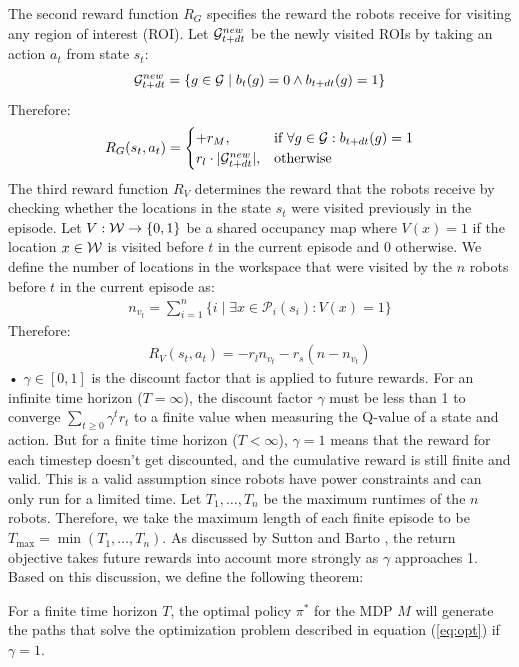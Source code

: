 \documentclass{article}
\begin{document}
The second reward function $R_G$ specifies the reward the robots receive for visiting any region of interest (ROI). Let $\mathcal{G}^{new}_{t+dt}$ be the newly visited ROIs by taking an action $a_t$ from state $s_t$:
\begin{equation}
    \mathcal{G}^{new}_{t+dt} = \{ g \in \mathcal{G} \mid b_t(g) = 0 \land b_{t+dt}(g) = 1 \}
\end{equation}
Therefore:
\begin{align}
R_G(s_t, a_t) = 
\begin{cases}
    +r_M, &\text{if } \forall g \in \mathcal{G}: b_{t+dt} (g) = 1 \\
    r_l \cdot |\mathcal{G}^{new}_{t+dt}|, & \text{otherwise} 
\end{cases}
\end{align}
The third reward function $R_V$ determines the reward that the robots receive by checking whether the locations in the state $s_t$ were visited previously in the episode. Let $V: {\mathcal{W}} \to \{0,1\}$ be a shared occupancy map where $V(x) = 1$ if the location $x \in \mathcal{W}$ is visited before $t$ in the current episode and 0 otherwise. We define the number of locations in the workspace that were visited by the $n$ robots before $t$ in the current episode as:
\begin{align}
n_{v_t} = \sum_{i=1}^n \{ i \mid \exists x \in \mathcal{P}_i(s_i): V(x) = 1 \}
\end{align}
Therefore:
\begin{align}
R_V(s_t, a_t) = - r_l n_{v_t} - r_s (n - n_{v_t}) \label{eq:reward_V}
\end{align}
• $\gamma \in [0,1]$ is the discount factor that is applied to future rewards.
For an infinite time horizon ($T=\infty$), the discount factor $\gamma$ must be less than 1 to converge $\sum_{t\geq0}\gamma^t r_t$ to a finite value when measuring the Q-value of a state and action. But for a finite time horizon ($T < \infty$), $\gamma = 1$ means that the reward for each timestep doesn't get discounted, and the cumulative reward is still finite and valid. This is a valid assumption since robots have power constraints and can only run for a limited time. Let $T_1, \ldots, T_n$ be the maximum runtimes of the $n$ robots. Therefore, we take the maximum length of each finite episode to be $T_{\max} = \min(T_1,\ldots,T_n)$. As discussed by Sutton and Barto \citep{sutton2018reinforcement}, the return objective takes future rewards into account more strongly as $\gamma$ approaches 1. Based on this discussion, we define the following theorem:
\begin{theorem}
    For a finite time horizon $T$, the optimal policy $\pi^*$ for the MDP $M$ will generate the paths that solve the optimization problem described in equation (\ref{eq:opt}) if $\gamma = 1$.
\end{theorem}
\end{document}
